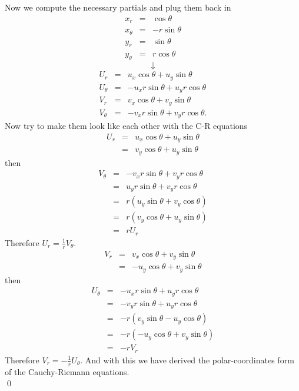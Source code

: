 \documentclass[10pt]{amsart}
\theoremstyle{nonumberplain}
\begin{document}
\begin{enumerate}[label={\bf {\arabic*}:}]
Now we compute the necessary partials and plug them back in
\begin{eqnarray*}
x_r &=& \cos \theta \\
x_\theta &=& - r \sin \theta \\
y_r &=& \sin \theta \\
y_\theta &=& r \cos \theta
\end{eqnarray*}
$$\downarrow$$
\begin{eqnarray*}
U_r &=& u_x \cos \theta + u_y \sin \theta \\
U_\theta &=& - u_x r \sin \theta + u_y r \cos \theta \\
V_r &=& v_x \cos \theta  + v_y  \sin \theta \\
V_\theta &=& - v_x r \sin \theta + v_y r \cos \theta.
\end{eqnarray*}
Now try to make them look like each other with the C-R equations
\begin{eqnarray*}
U_r &=& u_x \cos \theta + u_y \sin \theta \\
       &=& v_y \cos \theta + u_y \sin \theta
\end{eqnarray*}
then
\begin{eqnarray*}
V_\theta &=& - v_x r \sin \theta + v_y r \cos \theta \\
	      &=&  u_y r \sin \theta + v_y r \cos \theta \\
	      &=&  r (u_y \sin \theta + v_y \cos \theta ) \\
	      &=&  r (v_y \cos \theta + u_y \sin \theta) \\
	      &=&  r U_r
\end{eqnarray*}
Therefore $U_r = \frac{1}{r}V_\theta$.
\begin{eqnarray*}
V_r &=& v_x \cos \theta  + v_y  \sin \theta \\
       &=& -u_y \cos \theta  + v_y  \sin \theta
\end{eqnarray*}
then
\begin{eqnarray*}
U_\theta &=& - u_x r \sin \theta + u_y r \cos \theta \\
	      &=& - v_y r \sin \theta + u_y r \cos \theta \\
	      &=& - r (v_y \sin \theta - u_y \cos \theta) \\
	      &=& - r (- u_y \cos \theta + v_y \sin \theta) \\
	      &=& - r V_r
\end{eqnarray*}
Therefore $V_r = - \frac{1}{r}U_\theta$.
And with this we have derived the polar-coordinates form of the Cauchy-Riemann equations. \\
\qed
\end{enumerate}
\end{document}
